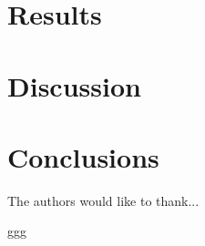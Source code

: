 \documentclass[12pt, halfline, a4paper]{ouparticle}
\begin{document}
\section{Results}
\label{res}

\section{Discussion}
\label{dis}

\section{Conclusions}
\label{con}


\begin{notes}[Acknowledgements]
The authors would like to thank...
\end{notes}

\begin{thebibliography}
ggg
\end{thebibliography}


\end{document}
